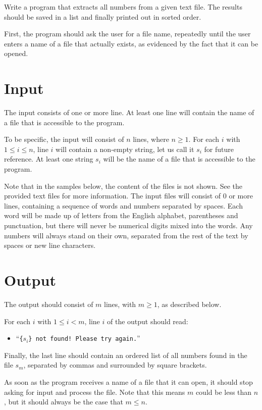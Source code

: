 

Write a program that extracts all numbers from a given text file.
The results should be saved in a list and finally printed out in sorted order.

First, the program should ask the user for a file name,
repeatedly until the user enters a name of a file that actually exists,
as evidenced by the fact that it can be opened.


\section*{Input}

The input consists of one or more line.
At least one line will contain the name of a file
that is accessible to the program.

To be specific, the input will consist of $n$ lines, where $n \ge 1$.
For each $i$ with $1 \le i \le n$,
line $i$ will contain a non-empty string, let us call it $s_i$ for future reference.
At least one string $s_i$ will be the name of a file
that is accessible to the program.

Note that in the samples below, the content of the files is not shown.
See the provided text files for more information.
The input files will consist of $0$ or more lines,
containing a sequence of words and numbers separated by spaces.
Each word will be made up of letters from the English alphabet, parentheses and punctuation,
but there will never be numerical digits mixed into the words.
Any numbers will always stand on their own,
separated from the rest of the text by spaces or new line characters.


\section*{Output}

The output should consist of $m$ lines, with $m \ge 1$, as described below.

For each $i$ with $1 \le i < m$,
line $i$ of the output should read:
\begin{itemize}
    \item
    ``\texttt{\{$s_i$\} not found! Please try again.}''
\end{itemize}

Finally, the last line should contain an ordered list
of all numbers found in the file $s_m$,
separated by commas and surrounded by square brackets.

As soon as the program receives a name of a file that it can open,
it should stop asking for input and process the file.
Note that this means $m$ could be less than $n$,
but it should always be the case that $m \le n$.
